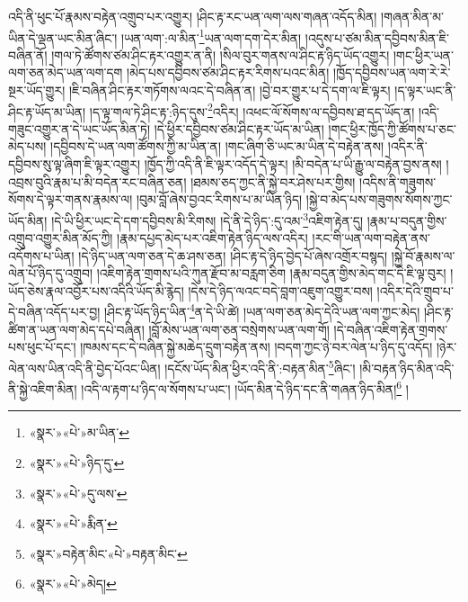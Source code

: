 འདི་ནི་ཕུང་པོ་རྣམས་བརྟེན་འགྲུབ་པར་འགྱུར། །ཤིང་རྟ་རང་ཡན་ལག་ལས་གཞན་འདོད་མིན། །གཞན་མིན་མ་ཡིན་དེ་ལྡན་ཡང་མིན་ཞིང་། །ཡན་ལག་:ལ་མིན་\footnote{«སྣར་»«པེ་»མ་ཡིན་}ཡན་ལག་དག་དེར་མིན། །འདུས་པ་ཙམ་མིན་དབྱིབས་མིན་ཇི་བཞིན་ནོ། །གལ་ཏེ་ཚོགས་ཙམ་ཤིང་རྟར་འགྱུར་ན་ནི། །སིལ་བུར་གནས་ལ་ཤིང་རྟ་ཉིད་ཡོད་འགྱུར། །གང་ཕྱིར་ཡན་ལག་ཅན་མེད་ཡན་ལག་དག །མེད་པས་དབྱིབས་ཙམ་ཤིང་རྟར་རིགས་པའང་མིན། །ཁྱོད་དབྱིབས་ཡན་ལག་རེ་རེ་སྔར་ཡོད་གྱུར། །ཇི་བཞིན་ཤིང་རྟར་གཏོགས་ལའང་དེ་བཞིན་ན། །བྱེ་བར་གྱུར་པ་དེ་དག་ལ་ཇི་ལྟར། །ད་ལྟར་ཡང་ནི་ཤིང་རྟ་ཡོད་མ་ཡིན། །ད་ལྟ་གལ་ཏེ་ཤིང་རྟ་:ཉིད་དུས་\footnote{«སྣར་»«པེ་»ཉིད་དུ་}འདིར། །འཕང་ལོ་སོགས་ལ་དབྱིབས་ཐ་དད་ཡོད་ན། །འདི་གཟུང་འགྱུར་ན་དེ་ཡང་ཡོད་མིན་ཏེ། །དེ་ཕྱིར་དབྱིབས་ཙམ་ཤིང་རྟར་ཡོད་མ་ཡིན། །གང་ཕྱིར་ཁྱོད་ཀྱི་ཚོགས་པ་ཅང་མེད་པས། །དབྱིབས་དེ་ཡན་ལག་ཚོགས་ཀྱི་མ་ཡིན་ན། །གང་ཞིག་ཅི་ཡང་མ་ཡིན་དེ་བརྟེན་ནས། །འདིར་ནི་དབྱིབས་སུ་ལྟ་ཞིག་ཇི་ལྟར་འགྱུར། །ཁྱོད་ཀྱི་འདི་ནི་ཇི་ལྟར་འདོད་དེ་ལྟར། །མི་བདེན་པ་ཡི་རྒྱུ་ལ་བརྟེན་བྱས་ནས། །འབྲས་བུའི་རྣམ་པ་མི་བདེན་རང་བཞིན་ཅན། །ཐམས་ཅད་ཀྱང་ནི་སྐྱེ་བར་ཤེས་པར་གྱིས། །འདིས་ནི་གཟུགས་སོགས་དེ་ལྟར་གནས་རྣམས་ལ། །བུམ་བློ་ཞེས་བྱའང་རིགས་པ་མ་ཡིན་ཉིད། །སྐྱེ་བ་མེད་པས་གཟུགས་སོགས་ཀྱང་ཡོད་མིན། །དེ་ཡི་ཕྱིར་ཡང་དེ་དག་དབྱིབས་མི་རིགས། །དེ་ནི་དེ་ཉིད་:དུ་འམ་\footnote{«སྣར་»«པེ་»དུ་ལས་}འཇིག་རྟེན་དུ། །རྣམ་པ་བདུན་གྱིས་འགྲུབ་འགྱུར་མིན་མོད་ཀྱི། །རྣམ་དཔྱད་མེད་པར་འཇིག་རྟེན་ཉིད་ལས་འདིར། །རང་གི་ཡན་ལག་བརྟེན་ནས་འདོགས་པ་ཡིན། །དེ་ཉིད་ཡན་ལག་ཅན་དེ་ཆ་ཤས་ཅན། །ཤིང་རྟ་དེ་ཉིད་བྱེད་པོ་ཞེས་འགྲོར་བསྙད། །སྐྱེ་བོ་རྣམས་ལ་ལེན་པོ་ཉིད་དུ་འགྲུབ། །འཇིག་རྟེན་གྲགས་པའི་ཀུན་རྫོབ་མ་བརླག་ཅིག །རྣམ་བདུན་གྱིས་མེད་གང་དེ་ཇི་ལྟ་བུར། །ཡོད་ཅེས་རྣལ་འབྱོར་པས་འདིའི་ཡོད་མི་རྙེད། །དེས་དེ་ཉིད་ལའང་བདེ་བླག་འཇུག་འགྱུར་བས། །འདིར་དེའི་གྲུབ་པ་དེ་བཞིན་འདོད་པར་བྱ། །ཤིང་རྟ་ཡོད་ཉིད་ཡིན་\footnote{«སྣར་»«པེ་»རྨིན་}ན་དེ་ཡི་ཚེ། །ཡན་ལག་ཅན་མེད་དེའི་ཡན་ལག་ཀྱང་མེད། །ཤིང་རྟ་ཚིག་ན་ཡན་ལག་མེད་དཔེ་བཞིན། །བློ་མེས་ཡན་ལག་ཅན་བསྲེགས་ཡན་ལག་གོ། །དེ་བཞིན་འཇིག་རྟེན་གྲགས་པས་ཕུང་པོ་དང་། །ཁམས་དང་དེ་བཞིན་སྐྱེ་མཆེད་དྲུག་བརྟེན་ནས། །བདག་ཀྱང་ཉེ་བར་ལེན་པ་ཉིད་དུ་འདོད། །ཉེར་ལེན་ལས་ཡིན་འདི་ནི་བྱེད་པོའང་ཡིན། །དངོས་ཡོད་མིན་ཕྱིར་འདི་ནི་:བརྟན་མིན་\footnote{«སྣར་»བརྟེན་མིང་«པེ་»བརྟན་མིང་}ཞིང་། །མི་བརྟན་ཉིད་མིན་འདི་ནི་སྐྱེ་འཇིག་མིན། །འདི་ལ་རྟག་པ་ཉིད་ལ་སོགས་པ་ཡང་། །ཡོད་མིན་དེ་ཉིད་དང་ནི་གཞན་ཉིད་མིན།\footnote{«སྣར་»«པེ་»མེད།} །
